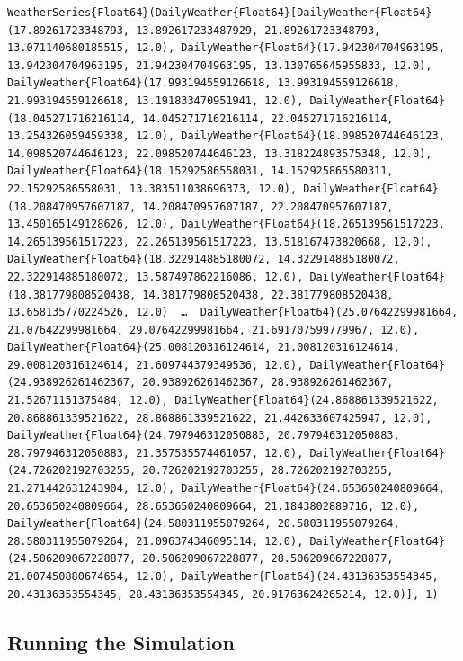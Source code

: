 \begin{verbatim}
WeatherSeries{Float64}(DailyWeather{Float64}[DailyWeather{Float64}(17.89261723348793, 13.892617233487929, 21.89261723348793, 13.071140680185515, 12.0), DailyWeather{Float64}(17.942304704963195, 13.942304704963195, 21.942304704963195, 13.130765645955833, 12.0), DailyWeather{Float64}(17.993194559126618, 13.993194559126618, 21.993194559126618, 13.191833470951941, 12.0), DailyWeather{Float64}(18.045271716216114, 14.045271716216114, 22.045271716216114, 13.254326059459338, 12.0), DailyWeather{Float64}(18.098520744646123, 14.098520744646123, 22.098520744646123, 13.318224893575348, 12.0), DailyWeather{Float64}(18.15292586558031, 14.152925865580311, 22.15292586558031, 13.383511038696373, 12.0), DailyWeather{Float64}(18.208470957607187, 14.208470957607187, 22.208470957607187, 13.450165149128626, 12.0), DailyWeather{Float64}(18.265139561517223, 14.265139561517223, 22.265139561517223, 13.518167473820668, 12.0), DailyWeather{Float64}(18.322914885180072, 14.322914885180072, 22.322914885180072, 13.587497862216086, 12.0), DailyWeather{Float64}(18.381779808520438, 14.381779808520438, 22.381779808520438, 13.658135770224526, 12.0)  …  DailyWeather{Float64}(25.07642299981664, 21.07642299981664, 29.07642299981664, 21.691707599779967, 12.0), DailyWeather{Float64}(25.008120316124614, 21.008120316124614, 29.008120316124614, 21.609744379349536, 12.0), DailyWeather{Float64}(24.938926261462367, 20.938926261462367, 28.938926261462367, 21.52671151375484, 12.0), DailyWeather{Float64}(24.868861339521622, 20.868861339521622, 28.868861339521622, 21.442633607425947, 12.0), DailyWeather{Float64}(24.797946312050883, 20.797946312050883, 28.797946312050883, 21.357535574461057, 12.0), DailyWeather{Float64}(24.726202192703255, 20.726202192703255, 28.726202192703255, 21.271442631243904, 12.0), DailyWeather{Float64}(24.653650240809664, 20.653650240809664, 28.653650240809664, 21.1843802889716, 12.0), DailyWeather{Float64}(24.580311955079264, 20.580311955079264, 28.580311955079264, 21.096374346095114, 12.0), DailyWeather{Float64}(24.506209067228877, 20.506209067228877, 28.506209067228877, 21.007450880674654, 12.0), DailyWeather{Float64}(24.43136353554345, 20.43136353554345, 28.43136353554345, 20.91763624265214, 12.0)], 1)
\end{verbatim}



\subsection{Running the Simulation}



